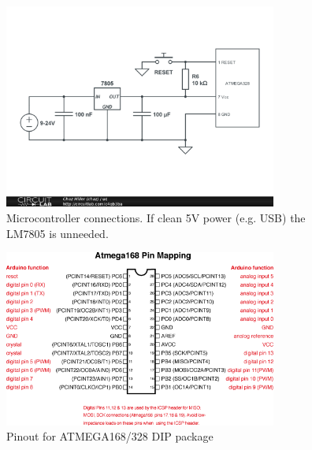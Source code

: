 \documentclass[dvips,12pt]{article}
\begin{document}
\begin{figure}[h]
    \begin{centering}
    \includegraphics[width=0.8\textwidth]{uc}
    \caption{Microcontroller connections. If clean 5V power (e.g. USB) the LM7805 is unneeded.} 
    \label{fig:uc}
    \end{centering}
\end{figure}
\begin{figure}[h]
    \begin{centering}
    \includegraphics[width=0.8\textwidth]{pins}
    \caption{Pinout for ATMEGA168/328 DIP package} 
    \label{fig:pins}
    \end{centering}
\end{figure}




\centering
\vspace{2cm}
\appendix
\end{document}
